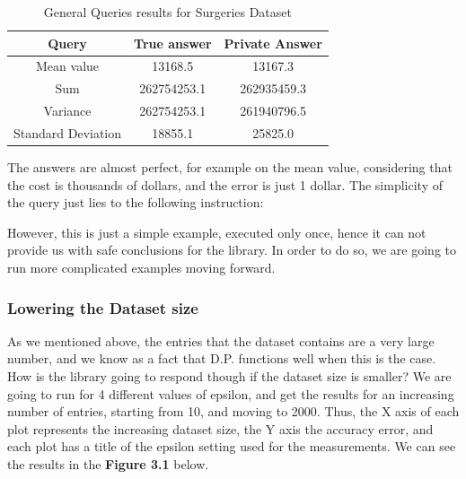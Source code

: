 \begin{table}[!htb]
    \centering
    \caption{General Queries results for Surgeries Dataset}
    \label{numbers}

    \begin{tabular}{| c | c | c |}
      \hline 
      Query & True answer & Private Answer \\
      \hline
      Mean value & 13168.5 & 13167.3 \\
      \hline
      Sum & 262754253.1 &  262935459.3 \\
      \hline
      Variance & 262754253.1 & 261940796.5\\
      \hline
      Standard Deviation & 18855.1 & 25825.0\\
      \hline
    \end{tabular}

\end{table}


The answers are almost perfect, for example on the mean value, considering that the cost is thousands of dollars, and the error is just 1 dollar. The simplicity of the query just lies to the following instruction:

However, this is just a simple example, executed only once, hence it can not provide us with safe conclusions for the library. In order to do so, we are going to run more complicated examples moving forward.

\subsubsection{Lowering the Dataset size}

As we mentioned above, the entries that the dataset contains are a very large number, and we know as a fact that D.P. functions well when this is the case. How is the library going to respond though if the dataset size is smaller? We are going to run for 4 different values of epsilon, and get the results for an increasing number of entries, starting from 10, and moving to 2000. Thus, the X axis of each plot represents the increasing dataset size, the Y axis the accuracy error, and each plot has a title of the epsilon setting used for the measurements. We can see the results in the \textbf{Figure 3.1} below.

